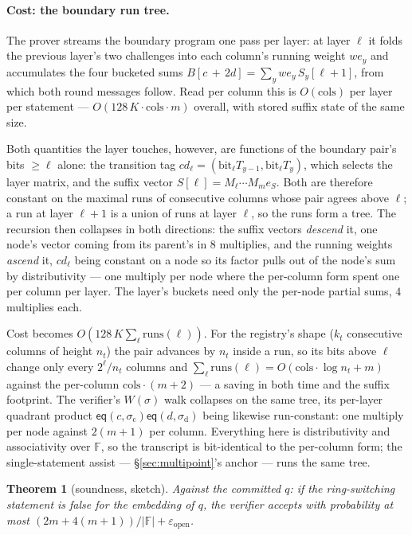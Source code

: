 \documentclass[11pt]{article}
\newcommand{\F}{\mathbb{F}}
\newcommand{\eq}{\mathsf{eq}}
\newtheorem{theorem}{Theorem}
\begin{document}
\paragraph{Cost: the boundary run tree.}\label{par:runtree}
The prover streams the boundary program one pass per layer: at layer
$\ell$ it folds the previous layer's two challenges into each column's
running weight $we_y$ and accumulates the four bucketed sums
$B[c\,{+}\,2d] = \sum_y we_y\, S_y[\ell{+}1]$, from which both round
messages follow. Read per column this is $O(\mathrm{cols})$ per layer
per statement --- $O(128\,K \cdot \mathrm{cols} \cdot m)$ overall, with
stored suffix state of the same size.

Both quantities the layer touches, however, are functions of the
boundary pair's bits $\ge \ell$ alone: the transition tag
$cd_\ell = (\mathrm{bit}_\ell T_{y-1}, \mathrm{bit}_\ell T_y)$, which
selects the layer matrix, and the suffix vector
$S[\ell] = M_\ell \cdots M_m e_S$. Both are therefore constant on the
maximal runs of consecutive columns whose pair agrees above $\ell$; a
run at layer $\ell{+}1$ is a union of runs at layer $\ell$, so the runs
form a tree. The recursion then collapses in both directions: the
suffix vectors \emph{descend} it, one node's vector coming from its
parent's in $8$ multiplies, and the running weights \emph{ascend} it,
$cd_\ell$ being constant on a node so its factor pulls out of the
node's sum by distributivity --- one multiply per node where the
per-column form spent one per column per layer. The layer's buckets
need only the per-node partial sums, $4$ multiplies each.

Cost becomes $O(128\,K \sum_\ell \mathrm{runs}(\ell))$. For the
registry's shape ($k_t$ consecutive columns of height $n_t$) the pair
advances by $n_t$ inside a run, so its bits above $\ell$ change only
every $2^\ell/n_t$ columns and
$\sum_\ell \mathrm{runs}(\ell) = O(\mathrm{cols} \cdot \log n_t + m)$
against the per-column $\mathrm{cols}\cdot(m{+}2)$ --- a saving in both
time and the suffix footprint. The verifier's $W(\sigma)$ walk collapses
on the same tree, its per-layer quadrant product
$\eq(c,\sigma_{\mathrm c})\eq(d,\sigma_{\mathrm d})$ being likewise
run-constant: one multiply per node against $2(m{+}1)$ per column.
Everything here is distributivity and associativity over $\F$, so the
transcript is bit-identical to the per-column form; the
single-statement assist --- \S\ref{sec:multipoint}'s anchor --- runs
the same tree.

\begin{theorem}[soundness, sketch]\label{thm:soundness}
Against the committed $q$: if the ring-switching statement is false
for the embedding of $q$, the verifier accepts with
probability at most
$(2m + 4(m{+}1))/|\F| + \varepsilon_{\mathrm{open}}$.
\end{theorem}
\end{document}
